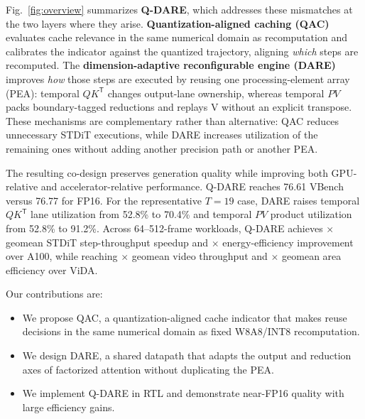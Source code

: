 Fig.~\ref{fig:overview} summarizes \textbf{Q-DARE}, which addresses these mismatches at the two layers where they arise. \textbf{Quantization-aligned caching (QAC)} evaluates cache relevance in the same numerical domain as recomputation and calibrates the indicator against the quantized trajectory, aligning \emph{which} steps are recomputed. The \textbf{dimension-adaptive reconfigurable engine (DARE)} improves \emph{how} those steps are executed by reusing one processing-element array (PEA): temporal $QK^{\mathsf T}$ changes output-lane ownership, whereas temporal $PV$ packs boundary-tagged reductions and replays V without an explicit transpose. These mechanisms are complementary rather than alternative: QAC reduces unnecessary STDiT executions, while DARE increases utilization of the remaining ones without adding another precision path or another PEA.

The resulting co-design preserves generation quality while improving both GPU-relative and accelerator-relative performance. Q-DARE reaches 76.61 VBench versus 76.77 for FP16. For the representative $T=19$ case, DARE raises temporal $QK^{\mathsf T}$ lane utilization from 52.8\% to 70.4\% and temporal $PV$ product utilization from 52.8\% to 91.2\%. Across 64--512-frame workloads, Q-DARE achieves \QDAREStepGeoA$\times$ geomean STDiT step-throughput speedup and \QDAREEnergyGeoA$\times$ energy-efficiency improvement over A100, while reaching \QDAREViDAThroughputGeo$\times$ geomean video throughput and \QDAREViDAreaGeo$\times$ geomean area efficiency over ViDA.

Our contributions are:
\begin{itemize}
  \item We propose QAC, a quantization-aligned cache indicator that makes reuse decisions in the same numerical domain as fixed W8A8/INT8 recomputation.
  \item We design DARE, a shared datapath that adapts the output and reduction axes of factorized attention without duplicating the PEA.
  \item We implement Q-DARE in RTL and demonstrate near-FP16 quality with large efficiency gains.
\end{itemize}
